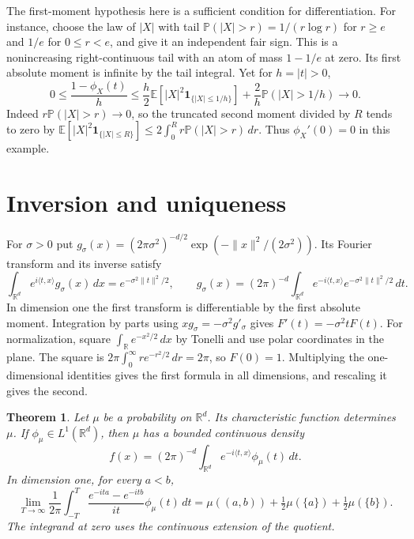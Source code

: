 \documentclass[11pt,oneside,openany]{book}
\newcommand{\Prob}{\mathbb{P}}
\newcommand{\E}{\mathbb{E}}
\newcommand{\R}{\mathbb{R}}
\newcommand{\ind}{\mathbf{1}}
\theoremstyle{plain}
\newtheorem{theorem}{Theorem}[chapter]
\theoremstyle{definition}
\theoremstyle{remark}
\begin{document}
The first-moment hypothesis here is a sufficient condition for
differentiation. For instance, choose the law of \(|X|\) with tail
\(\Prob(|X|>r)=1/(r\log r)\) for \(r\ge e\) and \(1/e\) for
\(0\le r<e\), and give it an independent fair sign. This is a
nonincreasing right-continuous tail with an atom of mass \(1-1/e\)
at zero. Its first absolute moment is infinite by the tail integral.
Yet for \(h=|t|>0\),
\[
 0\le \frac{1-\phi_X(t)}{h}
 \le \frac{h}{2}\E[|X|^2\ind_{\{|X|\le 1/h\}}]
        +\frac{2}{h}\Prob(|X|>1/h)\longrightarrow 0 .
\]
Indeed \(r\Prob(|X|>r)\to0\), so the truncated second moment divided by
\(R\) tends to zero by
\(\E[|X|^2\ind_{\{|X|\le R\}}]\le 2\int_0^R r\Prob(|X|>r)\,dr\).
Thus \(\phi_X'(0)=0\) in this example.

\section{Inversion and uniqueness}
\label{p07-02}

For \(\sigma>0\) put
\(g_\sigma(x)=(2\pi\sigma^2)^{-d/2}\exp(-\|x\|^2/(2\sigma^2))\).
Its Fourier transform and its inverse satisfy
\begin{equation}\label{eq:gaussian-transform}
 \int_{\R^d}e^{i\langle t,x\rangle}g_\sigma(x)\,dx
       =e^{-\sigma^2\|t\|^2/2},
 \qquad
 g_\sigma(x)=(2\pi)^{-d}\int_{\R^d}
        e^{-i\langle t,x\rangle}e^{-\sigma^2\|t\|^2/2}\,dt .
\end{equation}
In dimension one the first transform is differentiable by the first
absolute moment. Integration by parts using \(xg_\sigma=-\sigma^2g'_\sigma\)
gives \(F'(t)=-\sigma^2tF(t)\). For normalization, square
\(\int_{\R}e^{-x^2/2}\,dx\) by Tonelli and use polar coordinates in
the plane. The square is
\(2\pi\int_0^\infty r e^{-r^2/2}\,dr=2\pi\), so \(F(0)=1\).
Multiplying the one-dimensional identities gives the first formula in all
dimensions, and rescaling it gives the second.

\begin{theorem}\label{thm:cf-inversion}
Let \(\mu\) be a probability on \(\R^d\).
Its characteristic function determines \(\mu\).
If \(\phi_\mu\in L^1(\R^d)\), then \(\mu\) has a bounded continuous
density
\begin{equation}\label{eq:cf-inverse-density}
 f(x)=(2\pi)^{-d}\int_{\R^d}e^{-i\langle t,x\rangle}\phi_\mu(t)\,dt.
\end{equation}
In dimension one, for every \(a<b\),
\begin{equation}\label{eq:interval-inversion}
 \lim_{T\to\infty}\frac1{2\pi}
 \int_{-T}^{T}\frac{e^{-ita}-e^{-itb}}{it}\phi_\mu(t)\,dt
 =\mu((a,b))+\tfrac12\mu(\{a\})+\tfrac12\mu(\{b\}).
\end{equation}
The integrand at zero uses the continuous extension of the quotient.
\end{theorem}
\end{document}
